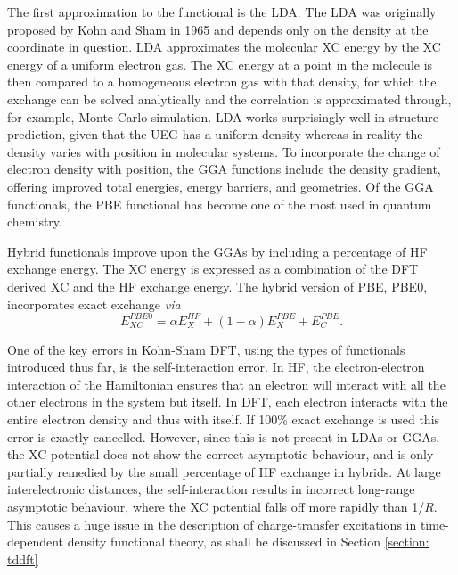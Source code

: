 The first approximation to the functional is the \ac{LDA}. The LDA was originally proposed by Kohn and Sham in 1965 and depends only on the density at the coordinate in question. LDA approximates the molecular \ac{XC} energy by the \ac{XC} energy of a uniform electron gas. The \ac{XC} energy at a point in the molecule is then compared to a homogeneous electron gas with that density, for which the exchange can be solved analytically and the correlation is approximated through, for example, Monte-Carlo simulation.\cite{Ullrich2012} LDA works surprisingly well in structure prediction, given that the UEG has a uniform density whereas in reality the density varies with position in molecular systems. To incorporate the change of electron density with position, the \ac{GGA} functions include the density gradient, offering improved total energies, energy barriers, and geometries. Of the \ac{GGA} functionals, the PBE functional has become one of the most used in quantum chemistry.\cite{Perdew1996}

Hybrid functionals improve upon the \ac{GGA}s by including a percentage of \ac{HF} exchange energy. The \ac{XC} energy is expressed as a combination of the \ac{DFT} derived \ac{XC} and the \ac{HF} exchange energy. The hybrid version of PBE, PBE0, incorporates exact exchange \textit{via}
\begin{equation}
    E_{XC}^{PBE0}=\alpha{}E_{X}^{HF}+(1-\alpha{})E_{X}^{PBE}+E_{C}^{PBE}.
\end{equation}

One of the key errors in Kohn-Sham \ac{DFT}, using the types of functionals introduced thus far, is the self-interaction error. In \ac{HF}, the electron-electron interaction of the Hamiltonian ensures that an electron will interact with all the other electrons in the system but itself. In \ac{DFT}, each electron interacts with the entire electron density and thus with itself. If 100\% exact exchange is used this error is exactly cancelled. However, since this is not present in \ac{LDA}s or \ac{GGA}s, the \ac{XC}-potential does not show the correct asymptotic behaviour, and is only partially remedied by the small percentage of \ac{HF} exchange in hybrids. At large interelectronic distances, the self-interaction results in incorrect long-range asymptotic behaviour, where the \ac{XC} potential falls off more rapidly than 1/$R$. This causes a huge issue in the description of charge-transfer excitations in time-dependent density functional theory, as shall be discussed in Section \ref{section: tddft}

